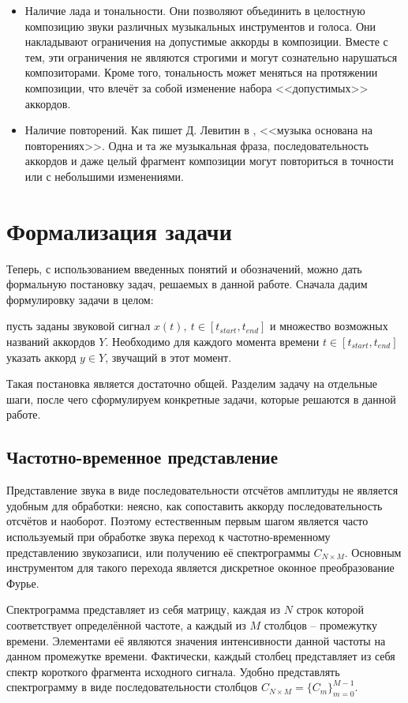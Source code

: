 \begin{itemize}
  \item Наличие лада и тональности. Они позволяют объединить в целостную
  композицию звуки различных музыкальных инструментов и голоса. Они накладывают
  ограничения на допустимые аккорды в композиции. Вместе с тем, эти ограничения
  не являются строгими и могут сознательно нарушаться композиторами. Кроме того,
  тональность может меняться на протяжении композиции, что влечёт за собой
  изменение набора <<допустимых>> аккордов.
  
  \item Наличие повторений. Как пишет Д. Левитин в \cite{Levitin2006},
  <<музыка основана на повторениях>>. Одна и та же музыкальная фраза,
  последовательность аккордов и даже целый фрагмент композиции могут повториться
  в точности или с небольшими изменениями.
\end{itemize}

\section{Формализация задачи} \label{sectT_task}

Теперь, с использованием введенных понятий и обозначений, можно дать
формальную постановку задач, решаемых в данной работе. Сначала дадим
формулировку задачи в целом:

пусть заданы звуковой сигнал $x(t),~t \in [t_{start}, t_{end}]$ и множество
возможных названий аккордов $Y$. Необходимо для каждого момента времени $t \in
[t_{start}, t_{end}]$ указать аккорд $y \in Y$, звучащий в этот момент.

Такая постановка является достаточно общей. Разделим задачу на отдельные шаги,
после чего сформулируем конкретные задачи, которые решаются в данной работе.

\subsection{Частотно-временное представление}

Представление звука в виде последовательности отсчётов амплитуды не является
удобным для обработки: неясно, как сопоставить аккорду последовательность
отсчётов и наоборот. Поэтому естественным первым шагом является часто
используемый при обработке звука переход к частотно-временному представлению
звукозаписи, или получению её спектрограммы $C_{N \times M}$. Основным
инструментом для такого перехода является дискретное оконное преобразование
Фурье.

Спектрограмма представляет из себя матрицу, каждая из $N$ строк которой
соответствует определённой частоте, а каждый из $M$ столбцов -- промежутку
времени. Элементами её являются значения интенсивности данной частоты на данном
промежутке времени. Фактически, каждый столбец представляет из себя спектр
короткого фрагмента исходного сигнала. Удобно представлять спектрограмму в виде
последовательности столбцов $C_{N \times M} = \{C_m\}_{m=0}^{M-1}$.

